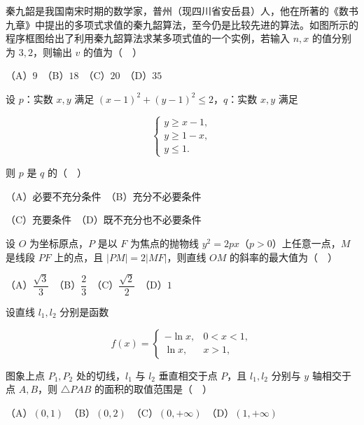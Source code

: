 \begin{question}
秦九韶是我国南宋时期的数学家，普州（现四川省安岳县）人，他在所著的《数书九章》中提出的多项式求值的秦九韶算法，至今仍是比较先进的算法。如图所示的程序框图给出了利用秦九韶算法求某多项式值的一个实例，若输入 \(n,x\) 的值分别为 \(3,2\)，则输出 \(v\) 的值为（　）
\nopagebreak[4]
\begin{center}\end{center}
\nopagebreak[4]
（A）\(9\)　（B）\(18\)　（C）\(20\)　（D）\(35\)

\end{question}
\begin{question}
设 \(p\)：实数 \(x,y\) 满足 \((x-1)^{2}+(y-1)^{2}\leqslant 2\)，\(q\)：实数 \(x,y\) 满足

\nopagebreak[4]
\[
\begin{cases}
y\geqslant x-1,\\
y\geqslant 1-x,\\
y\leqslant 1.
\end{cases}
\]

则 \(p\) 是 \(q\) 的（　）

（A）必要不充分条件　（B）充分不必要条件

（C）充要条件　（D）既不充分也不必要条件

\end{question}
\begin{question}
设 \(O\) 为坐标原点，\(P\) 是以 \(F\) 为焦点的抛物线 \(y^{2}=2px\)（\(p>0\)）上任意一点，\(M\) 是线段 \(PF\) 上的点，且 \(|PM|=2|MF|\)，则直线 \(OM\) 的斜率的最大值为（　）

（A）\(\dfrac{\sqrt{3}}{3}\)　（B）\(\dfrac{2}{3}\)　（C）\(\dfrac{\sqrt{2}}{2}\)　（D）\(1\)

\end{question}
\begin{question}
设直线 \(l_{1},l_{2}\) 分别是函数

\nopagebreak[4]
\[
f(x)=\begin{cases}
-\ln x, & 0<x<1,\\
\ln x, & x>1,
\end{cases}
\]

图象上点 \(P_{1},P_{2}\) 处的切线，\(l_{1}\) 与 \(l_{2}\) 垂直相交于点 \(P\)，且 \(l_{1},l_{2}\) 分别与 \(y\) 轴相交于点 \(A,B\)，则 \(\triangle PAB\) 的面积的取值范围是（　）

（A）\((0,1)\)　（B）\((0,2)\)　（C）\((0,+\infty)\)　（D）\((1,+\infty)\)

\end{question}
